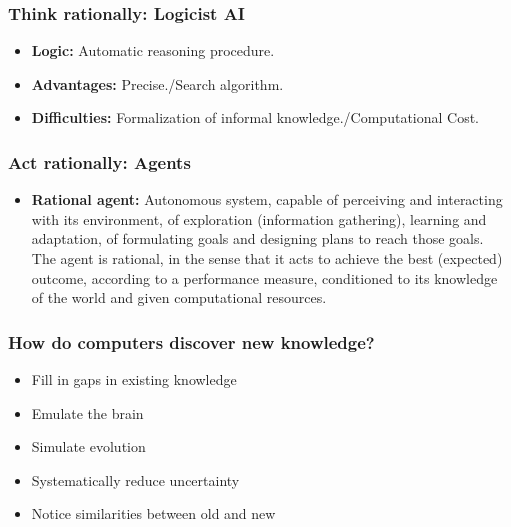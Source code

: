 \documentclass[UTF8,11pt,colorlinks,compress,openany]{beamer}%
\begin{document}
\begin{frame}\frametitle{Think rationally: Logicist AI}
\begin{itemize}
	\item \textbf{Logic:} Automatic reasoning procedure.
	\item \textbf{Advantages:} Precise./Search algorithm.
	\item \textbf{Difficulties:} Formalization of informal knowledge./Computational Cost.
\end{itemize}
\end{frame}

\begin{frame}\frametitle{Act rationally: Agents}
\begin{itemize}
	\item \textbf{Rational agent:} Autonomous system, capable of perceiving and interacting with its environment, of exploration (information gathering), learning and adaptation, of formulating goals and designing plans to reach those goals. The agent is rational, in the sense that it acts to achieve the best (expected) outcome, according to a performance measure, conditioned to its knowledge of the world and given computational resources.
\end{itemize}
\end{frame}

\begin{frame}\frametitle{How do computers discover new knowledge?}
\begin{itemize}
	\item Fill in gaps in existing knowledge
	\item Emulate the brain
	\item Simulate evolution
	\item Systematically reduce uncertainty
	\item Notice similarities between old and new
\end{itemize}
\end{frame}
\end{document}

